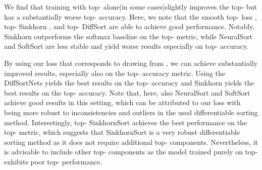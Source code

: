 \documentclass{article}
\begin{document}
We find that training with top- alone|in some cases|slightly improves the top- but has a substantially worse top- accuracy.
Here, we note that the smooth top- loss \citep{berrada2018smooth}, top- Sinkhorn \citep{Cuturi2019-SortingOT}, and top- DiffSort \citep{Petersen2021-diffsort} are able to achieve good performance.
Notably, Sinkhorn \citep{Cuturi2019-SortingOT} outperforms the softmax baseline on the top- metric, while NeuralSort and SoftSort are less stable and yield worse results especially on top- accuracy. 

By using our loss that corresponds to drawing  from , we can achieve substantially improved results, especially also on the top- accuracy metric.
Using the DiffSortNets yields the best results on the top- accuracy and Sinkhorn yields the best results on the top- accuracy.
Note that, here, also NeuralSort and SoftSort achieve good results in this setting, which can be attributed to our loss with  being more robust to inconsistencies and outliers in the used differentiable sorting method.
Interestingly, top- SinkhornSort achieves the best performance on the top- metric, which suggests that SinkhornSort is a very robust differentiable sorting method as it does not require additional top- components.
Nevertheless, it is advisable to include other top- components as the model trained purely on top- exhibits poor top- performance.
\end{document}
